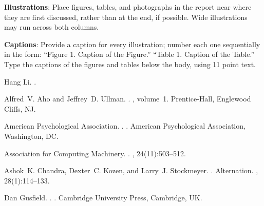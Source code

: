 \documentclass[11pt]{article}
\begin{document}
{\bf Illustrations}: Place figures, tables, and photographs in the
report near where they are first discussed, rather than at the end, if
possible.  Wide illustrations may run across both columns.

{\bf Captions}: Provide a caption for every illustration; number each one
sequentially in the form:  ``Figure 1. Caption of the Figure.'' ``Table 1.
Caption of the Table.''  Type the captions of the figures and 
tables below the body, using 11 point text.

\begin{thebibliography}{}

Hang Li.
.

Alfred~V. Aho and Jeffrey~D. Ullman.
.
, volume~1.
\newblock Prentice-{Hall}, Englewood Cliffs, NJ.

{American Psychological Association}.
.
.
\newblock American Psychological Association, Washington, DC.

{Association for Computing Machinery}.
.
, 24(11):503--512.

Ashok~K. Chandra, Dexter~C. Kozen, and Larry~J. Stockmeyer.
.
\newblock Alternation.
,
  28(1):114--133.

Dan Gusfield.
.
.
\newblock Cambridge University Press, Cambridge, UK.

\end{thebibliography}
\end{document}
